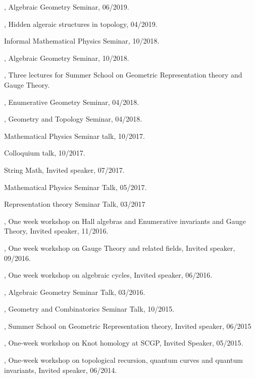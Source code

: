 \documentclass[11pt]{amsart}
\theoremstyle{plain}
\theoremstyle{definition}
\theoremstyle{remark}
\begin{document}
, Algebraic Geometry Seminar, 06/2019.

, Hidden algeraic structures in topology, 04/2019.

 Informal Mathematical Physics Seminar, 10/2018.

, Algebraic Geometry Seminar, 10/2018.

, Three lectures for Summer School on Geometric Representation theory and
Gauge Theory.

, Enumerative Geometry Seminar, 04/2018.

, Geometry and  Topology Seminar, 04/2018.

 Mathematical Physics Seminar talk, 10/2017.

 Colloquium talk, 10/2017.

 String Math, Invited speaker, 07/2017.

 Mathematical Physics Seminar Talk, 05/2017.

 Representation theory Seminar Talk, 03/2017

, One week workshop on Hall algebras and Enumerative invariants and Gauge Theory, Invited speaker, 11/2016.

, One week workshop on Gauge Theory and related fields, Invited speaker, 09/2016.

, One week workshop on algebraic cycles, Invited speaker, 06/2016.

, Algebraic Geometry Seminar Talk, 03/2016.


, Geometry and Combinatorics Seminar Talk, 10/2015.

, Summer School on Geometric Representation theory, Invited speaker, 06/2015

, One-week workshop on Knot homology at SCGP, Invited Speaker, 05/2015. 

,  One-week workshop on topological recursion, quantum curves and quantum invariants, Invited speaker, 06/2014. 
\end{document}

